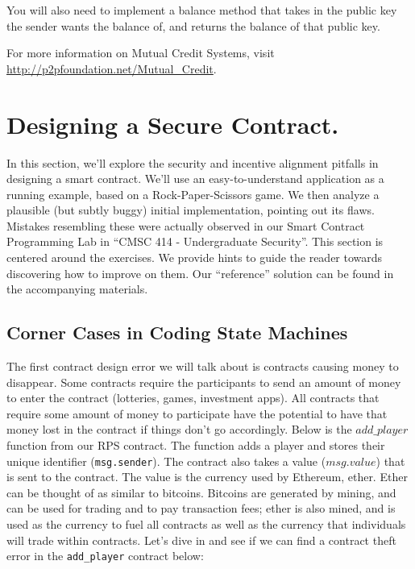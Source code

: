 \documentclass[12pt]{article}
\begin{document}
You will also need to implement a balance method that takes in the public key the sender wants the balance of, and returns the balance of that public key.

For more information on Mutual Credit Systems, visit \url{http://p2pfoundation.net/Mutual_Credit}.


\section{Designing a Secure Contract.}

In this section, we'll explore the security and incentive alignment pitfalls in designing a smart contract. We'll use an easy-to-understand application as a running example, based on a Rock-Paper-Scissors game. We then analyze a plausible (but subtly buggy) initial implementation, pointing out its flaws. Mistakes resembling these were actually observed in our Smart Contract Programming Lab in ``CMSC 414 - Undergraduate Security''. This section is centered around the exercises. We provide hints to guide the reader towards discovering how to improve on them. Our ``reference'' solution can be found in the accompanying materials.


\subsection{Corner Cases in Coding State Machines}
The first contract design error we will talk about is contracts causing money to disappear. Some contracts require the participants to send an amount of money to enter the contract (lotteries, games, investment apps). All contracts that require some amount of money to participate have the potential to have that money lost in the contract if things don't go accordingly. Below is the $add\_player$ function from our RPS contract. The function adds a player and stores their unique identifier (\texttt{msg.sender}). The contract also takes a value ($msg.value$) that is sent to the contract. The value is the currency used by Ethereum, ether. Ether can be thought of as similar to bitcoins. Bitcoins are generated by mining, and can be used for trading and to pay transaction fees; ether is also mined, and is used as the currency to fuel all contracts as well as the currency that individuals will trade within contracts. Let's dive in and see if we can find a contract theft error in the \texttt{add\_player} contract below: 
\end{document}

